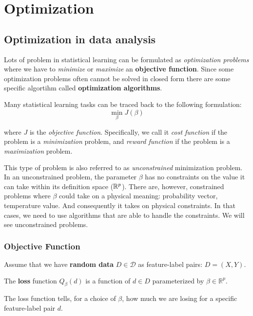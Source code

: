 \chapter{Optimization}

\section{Optimization in data analysis}
Lots of problem in statistical learning can be formulated as \textit{optimization problems} where we have to \textit{minimize} or \textit{maximize} an \textbf{objective function}. %
Since some optimization problems often cannot be solved in closed form there are some specific algortihm called \textbf{optimization algorithms}.

Many statistical learning tasks can be traced back to the following formulation:
\[
    \min_\beta J(\beta)
\]

where $J$ is the \textit{objective function}. Specifically, we call it \textit{cost function} if the problem is a \textit{minimization} problem, and \textit{reward function} if the problem is a \textit{maximization} problem.

This type of problem is also referred to as \textit{unconstrained} minimization problem. In an unconstrained problem, the parameter $\beta$ has no constraints on the value it can take within its definition space ($\mathbb{R}^p$).
There are, however, constrained problems where $\beta$ could take on a physical meaning: probability vector, temperature value. And consequently it takes on physical constraints.
In that cases, we need to use algorithms that are able to handle the constraints. We will see unconstrained problems.

\subsection{Objective Function}

Assume that we have \textbf{random data} $D \in \mathcal{D}$ as feature-label pairs: $D = (X,Y)$.

\begin{definition}
    The \textbf{loss} function $Q_\beta(d)$ is a function of $d \in D$ parameterized by $\beta \in \mathbb{R}^p$.
\end{definition}

The loss function tells, for a choice of $\beta$, how much we are losing for a specific feature-label pair $d$.

